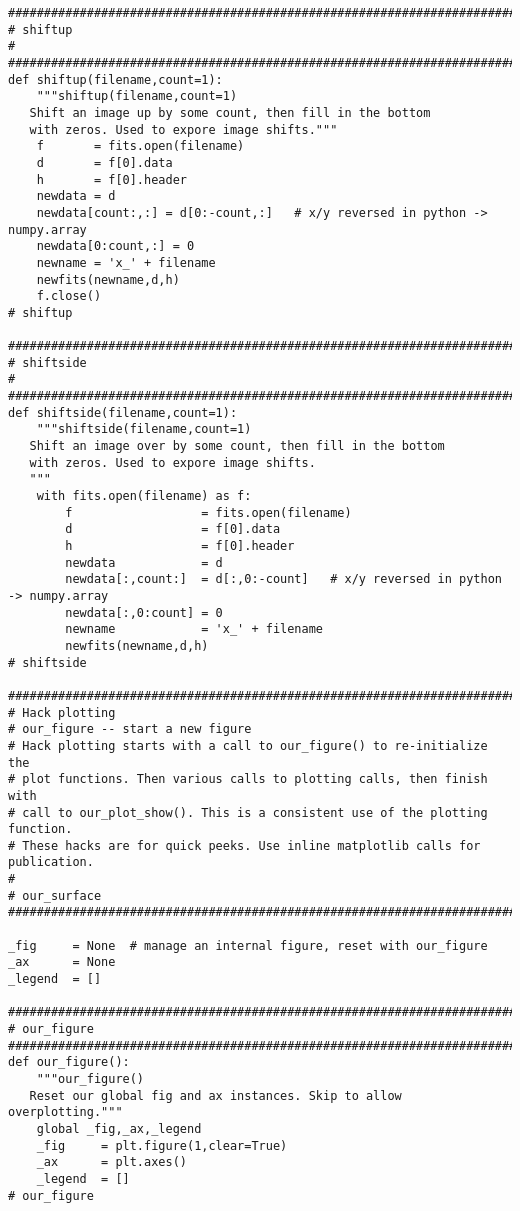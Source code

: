 {\begin{verbatim}
#############################################################################
# shiftup
#
#############################################################################
def shiftup(filename,count=1):
    """shiftup(filename,count=1)
   Shift an image up by some count, then fill in the bottom
   with zeros. Used to expore image shifts."""
    f       = fits.open(filename)
    d       = f[0].data
    h       = f[0].header
    newdata = d
    newdata[count:,:] = d[0:-count,:]   # x/y reversed in python -> numpy.array
    newdata[0:count,:] = 0
    newname = 'x_' + filename
    newfits(newname,d,h)
    f.close()
# shiftup

#############################################################################
# shiftside
#
#############################################################################
def shiftside(filename,count=1):
    """shiftside(filename,count=1)
   Shift an image over by some count, then fill in the bottom
   with zeros. Used to expore image shifts.
   """
    with fits.open(filename) as f:
        f                  = fits.open(filename)
        d                  = f[0].data
        h                  = f[0].header
        newdata            = d
        newdata[:,count:]  = d[:,0:-count]   # x/y reversed in python -> numpy.array
        newdata[:,0:count] = 0
        newname            = 'x_' + filename
        newfits(newname,d,h)
# shiftside

#############################################################################
# Hack plotting
# our_figure -- start a new figure
# Hack plotting starts with a call to our_figure() to re-initialize the
# plot functions. Then various calls to plotting calls, then finish with
# call to our_plot_show(). This is a consistent use of the plotting function.
# These hacks are for quick peeks. Use inline matplotlib calls for publication.
#
# our_surface
#############################################################################

_fig     = None  # manage an internal figure, reset with our_figure
_ax      = None
_legend  = []

#############################################################################
# our_figure
#############################################################################
def our_figure():
    """our_figure()
   Reset our global fig and ax instances. Skip to allow overplotting."""
    global _fig,_ax,_legend
    _fig     = plt.figure(1,clear=True)
    _ax      = plt.axes()
    _legend  = []
# our_figure


\end{verbatim}}
